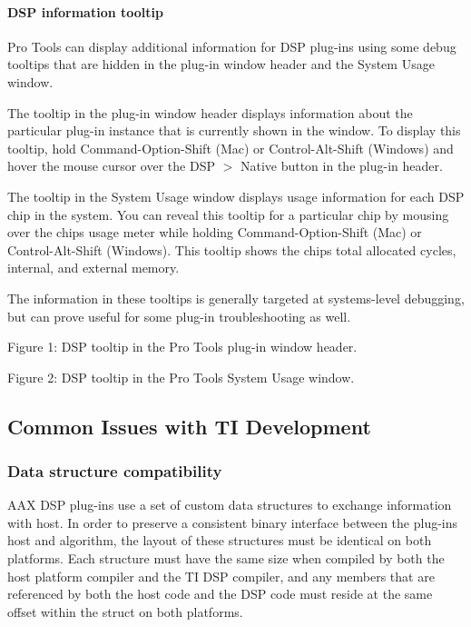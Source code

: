 \hypertarget{a00832_subsubsection__dsp_information_tooltip_}{}\paragraph{D\+S\+P information tooltip}\label{a00832_subsubsection__dsp_information_tooltip_}
 Pro Tools can display additional information for D\+SP plug-\/ins using some debug tooltips that are hidden in the plug-\/in window header and the System Usage window.

The tooltip in the plug-\/in window header displays information about the particular plug-\/in instance that is currently shown in the window. To display this tooltip, hold Command-\/\+Option-\/\+Shift (Mac) or Control-\/\+Alt-\/\+Shift (Windows) and hover the mouse cursor over the D\+SP $>$ Native button in the plug-\/in header.

The tooltip in the System Usage window displays usage information for each D\+SP chip in the system. You can reveal this tooltip for a particular chip by mousing over the chip\textquotesingle{}s usage meter while holding Command-\/\+Option-\/\+Shift (Mac) or Control-\/\+Alt-\/\+Shift (Windows). This tooltip shows the chip\textquotesingle{}s total allocated cycles, internal, and external memory.

The information in these tooltips is generally targeted at systems-\/level debugging, but can prove useful for some plug-\/in troubleshooting as well.

  Figure 1\+: D\+SP tooltip in the Pro Tools plug-\/in window header. 

  Figure 2\+: D\+SP tooltip in the Pro Tools System Usage window. 



 \hypertarget{a00832_aax_ti_guide_05_common_issues_with_ti_development}{}\subsection{Common Issues with T\+I Development}\label{a00832_aax_ti_guide_05_common_issues_with_ti_development}
 \hypertarget{a00832_subsection__data_structure_compatibility}{}\subsubsection{Data structure compatibility}\label{a00832_subsection__data_structure_compatibility}
A\+AX D\+SP plug-\/ins use a set of custom data structures to exchange information with host. In order to preserve a consistent binary interface between the plug-\/in\textquotesingle{}s host and algorithm, the layout of these structures must be identical on both platforms. Each structure must have the same size when compiled by both the host platform compiler and the TI D\+SP compiler, and any members that are referenced by both the host code and the D\+SP code must reside at the same offset within the struct on both platforms.

